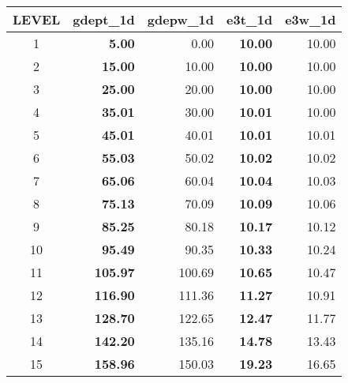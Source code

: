 \documentclass[../main/NEMO_manual]{subfiles}
\begin{document}
\begin{table}
  \begin{center}
    \begin{tabular}{c||r|r|r|r}
      \hline
      \textbf{LEVEL} & \textbf{gdept\_1d} & \textbf{gdepw\_1d} & \textbf{e3t\_1d } & \textbf{e3w\_1d} \\
      \hline
      1              & \textbf{     5.00} &               0.00 & \textbf{   10.00} &            10.00 \\
      \hline
      2              & \textbf{    15.00} &	            10.00 & \textbf{   10.00} &            10.00 \\
      \hline
      3              & \textbf{    25.00} &              20.00 & \textbf{   10.00} &            10.00 \\
      \hline
      4              & \textbf{    35.01} &	            30.00 & \textbf{   10.01} &            10.00 \\
      \hline
      5              & \textbf{    45.01} &              40.01 & \textbf{   10.01} &            10.01 \\
      \hline
      6              & \textbf{    55.03} &              50.02 & \textbf{   10.02} &            10.02 \\
      \hline
      7              & \textbf{    65.06} &              60.04 & \textbf{   10.04} &            10.03 \\
      \hline
      8              & \textbf{    75.13} &              70.09 & \textbf{   10.09} &            10.06 \\
      \hline
      9              & \textbf{    85.25} &              80.18 & \textbf{   10.17} &            10.12 \\
      \hline
      10             & \textbf{    95.49} &              90.35 & \textbf{   10.33} &            10.24 \\
      \hline
      11             & \textbf{   105.97} &             100.69 & \textbf{   10.65} &            10.47 \\
      \hline
      12             & \textbf{   116.90} &             111.36 & \textbf{   11.27} &            10.91 \\
      \hline
      13             & \textbf{   128.70} &             122.65 & \textbf{   12.47} &            11.77 \\
      \hline
      14             & \textbf{   142.20} &             135.16 & \textbf{   14.78} &            13.43 \\
      \hline
      15             & \textbf{   158.96} &             150.03 & \textbf{   19.23} &            16.65 \\

\end{tabular}
\end{center}
\end{table}
\end{document}
